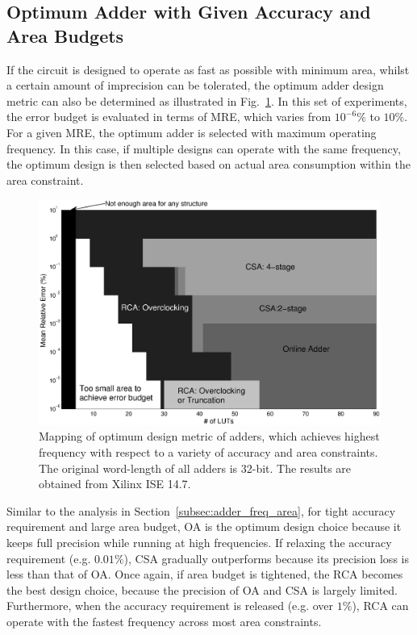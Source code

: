 \documentclass[10pt, conference, compsocconf]{IEEEtran}
\begin{document}
\subsection{Optimum Adder with Given Accuracy and Area Budgets}\label{subsec:adder_accuracy_area}
If the circuit is designed to operate as fast as possible with minimum area, whilst a certain amount of imprecision can be tolerated, the optimum adder design metric can also be determined as illustrated in Fig.~\ref{Fig:adder_3d_ErrorArea}. In this set of experiments, the error budget is evaluated in terms of MRE, which varies from $10^{-6}\%$ to $10\%$. For a given MRE, the optimum adder is selected with maximum operating frequency. In this case, if multiple designs can operate with the same frequency, the optimum design is then selected based on actual area consumption within the area constraint.
%
\begin{figure}[tbp]
  \centering
  \includegraphics[width=.7\textwidth]{./figures/exp/3d_ErrorArea.eps}
  \vspace{-3ex}
  \caption{Mapping of optimum design metric of adders, which achieves highest frequency with respect to a variety of accuracy and area constraints. The original word-length of all adders is 32-bit. The results are obtained from Xilinx ISE 14.7.}
  \label{Fig:adder_3d_ErrorArea}
\end{figure}

Similar to the analysis in Section~\ref{subsec:adder_freq_area}, for tight accuracy requirement and large area budget, OA is the optimum design choice because it keeps full precision while running at high frequencies. If relaxing the accuracy requirement (e.g. $0.01\%$), CSA gradually outperforms because its precision loss is less than that of OA. Once again, if area budget is tightened, the RCA becomes the best design choice, because the precision of OA and CSA is largely limited. Furthermore, when the accuracy requirement is released (e.g. over $1\%$), RCA can operate with the fastest frequency across most area constraints.  
\end{document}
